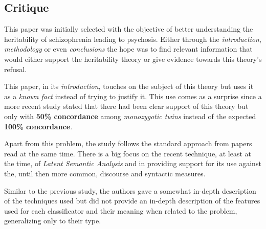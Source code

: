 \documentclass{Paper_Summary}
\begin{document}
\makepapertitle

\breakline

\begin{center}
    \section*{Critique}
\end{center}

    This paper was initially selected with the objective of better understanding the heritability of schizophrenia leading to psychosis. Either through the \emph{introduction}, \emph{methodology} or even \emph{conclusions} the hope was to find relevant information that would either support the heritability theory or give evidence towards this theory's refusal.

    This paper, in its \emph{introduction}, touches on the subject of this theory but uses it as a \emph{known fact} instead of trying to justify it. This use comes as a surprise since a more recent study stated that there had been clear support of this theory but only with \textbf{50\% concordance} among \emph{monozygotic twins} instead of the expected \textbf{100\% concordance}.

    Apart from this problem, the study follows the standard approach from papers read at the same time. There is a big focus on the recent technique, at least at the time, of \emph{Latent Semantic Analysis} and in providing support for its use against the, until then more common, discourse and syntactic measures.

    Similar to the previous study, the authors gave a somewhat in-depth description of the techniques used but did not provide an in-depth description of the features used for each classificator and their meaning when related to the problem, generalizing only to their type.

\breakline
\end{document}
